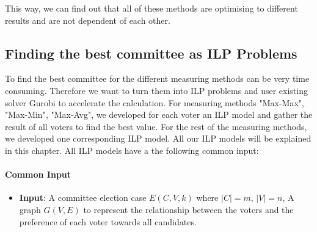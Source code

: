 \documentclass{article}
\begin{document}
  

This way, we can find out that all of these methods are optimising to different results and are not dependent of each other.


\subsection{Finding the best committee as ILP Problems}

To find the best committee for the different measuring methods can be very time consuming. Therefore we want to turn them into ILP problems and user existing solver Gurobi to accelerate the calculation. For measuring methods "Max-Max", "Max-Min", "Max-Avg", we developed for each voter an ILP model and gather the result of all voters to find the best value. For the rest of the measuring methods, we developed one corresponding ILP model. All our ILP models will be explained in this chapter. All ILP models have a the following common input:

\paragraph*{Common Input}
\begin{itemize}
  \item \textbf{Input}:
A committee election case $E (C,V,k)$ where $\vert C \vert =m $, $\vert V \vert =n$, A graph $G(V,E)$ to represent the relationship between the voters and the preference of each voter towards all candidates.
\end{itemize}
\end{document}
